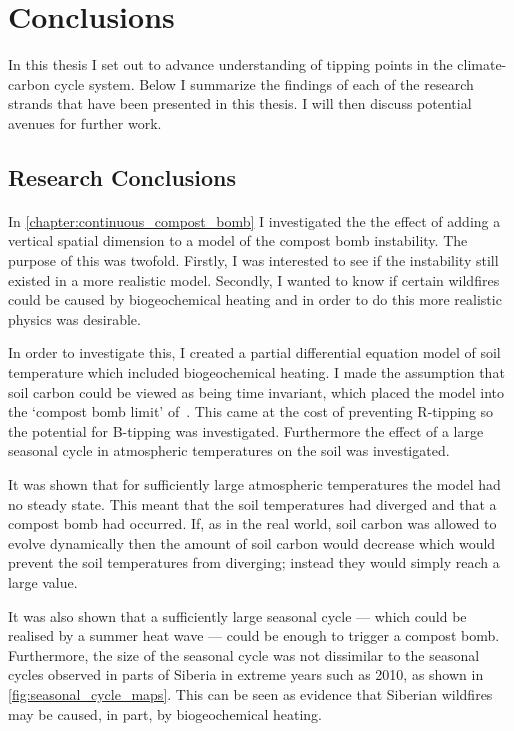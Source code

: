 \chapter{Conclusions}
\graphicspath{{conclusions/figs}}

In this thesis I set out to advance understanding of tipping points in the climate-carbon cycle system.
Below I summarize the findings of each of the research strands that have been presented in this thesis. I will then discuss potential avenues for further work.

\section{Research Conclusions}
\subsubsection{}

In \cref{chapter:continuous_compost_bomb} I investigated the the effect of adding a vertical spatial dimension to a model of the compost bomb instability.
The purpose of this was twofold. 
Firstly, I was interested to see if the instability still existed in a more realistic model.
Secondly, I wanted to know if certain wildfires could be caused by biogeochemical heating and in order to do this more realistic physics was desirable.

In order to investigate this, I created a partial differential equation model of soil temperature which included biogeochemical heating. I made the assumption
that soil carbon could be viewed as being time invariant, which placed the model into the `compost bomb limit' of~\cite{Luke2011}. This came at the cost of preventing
R-tipping so the potential for B-tipping was investigated. Furthermore the effect of a large seasonal cycle in atmospheric temperatures on the soil was investigated.

It was shown that for sufficiently large atmospheric temperatures the model had no steady state. This meant that the soil temperatures had diverged and that a compost bomb
had occurred. If, as in the real world, soil carbon was allowed to evolve dynamically then the amount of soil carbon would decrease which would prevent the soil temperatures from diverging;
instead they would simply reach a large value.

It was also shown that a sufficiently large seasonal cycle --- which could be realised by a summer heat wave --- could be enough to trigger a compost bomb.
Furthermore, the size of the seasonal cycle was not dissimilar to the seasonal cycles observed in parts of Siberia in extreme years such as 2010, as shown in \cref{fig:seasonal_cycle_maps}.
This can be seen as evidence that Siberian wildfires may be caused, in part, by biogeochemical heating. 

